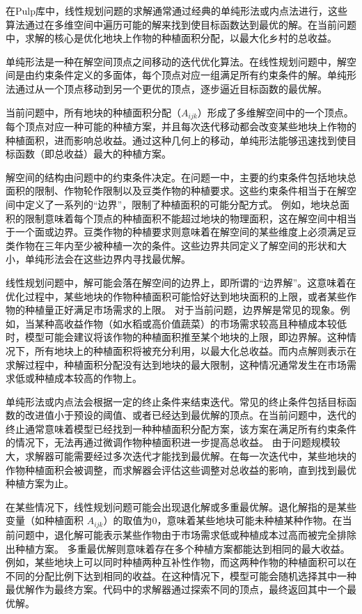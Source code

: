 \documentclass[12pt,a4paper]{nmmcm}
\begin{document}
在Pulp库中，线性规划问题的求解通常通过经典的单纯形法或内点法进行，这些算法通过在多维空间中遍历可能的解来找到使目标函数达到最优的解。在当前问题中，求解的核心是优化地块上作物的种植面积分配，以最大化乡村的总收益。

单纯形法是一种在解空间顶点之间移动的迭代优化算法。在线性规划问题中，解空间是由约束条件定义的多面体，每个顶点对应一组满足所有约束条件的解。单纯形法通过从一个顶点移动到另一个更优的顶点，逐步逼近目标函数的最优解。

当前问题中，所有地块的种植面积分配（$A_{ijk}$）形成了多维解空间中的一个顶点。每个顶点对应一种可能的种植方案，并且每次迭代移动都会改变某些地块上作物的种植面积，进而影响总收益。通过这种几何上的移动，单纯形法能够迅速找到使目标函数（即总收益）最大的种植方案。

解空间的结构由问题中的约束条件决定。在问题一中，主要的约束条件包括地块总面积的限制、作物轮作限制以及豆类作物的种植要求。这些约束条件相当于在解空间中定义了一系列的“边界”，限制了种植面积的可能分配方式。 例如，地块总面积的限制意味着每个顶点的种植面积不能超过地块的物理面积，这在解空间中相当于一个面或边界。豆类作物的种植要求则意味着在解空间的某些维度上必须满足豆类作物在三年内至少被种植一次的条件。这些边界共同定义了解空间的形状和大小，单纯形法会在这些边界内寻找最优解。
  
线性规划问题中，解可能会落在解空间的边界上，即所谓的“边界解”。这意味着在优化过程中，某些地块的作物种植面积可能恰好达到地块面积的上限，或者某些作物的种植量正好满足市场需求的上限。 对于当前问题，边界解是常见的现象。例如，当某种高收益作物（如水稻或高价值蔬菜）的市场需求较高且种植成本较低时，模型可能会建议将该作物的种植面积推至某个地块的上限，即边界解。这种情况下，所有地块上的种植面积将被充分利用，以最大化总收益。而内点解则表示在求解过程中，种植面积分配没有达到地块的最大限制，这种情况通常发生在市场需求低或种植成本较高的作物上。
  
单纯形法或内点法会根据一定的终止条件来结束迭代。常见的终止条件包括目标函数的改进值小于预设的阈值、或者已经达到最优解的顶点。在当前问题中，迭代的终止通常意味着模型已经找到一种种植面积分配方案，该方案在满足所有约束条件的情况下，无法再通过微调作物种植面积进一步提高总收益。 由于问题规模较大，求解器可能需要经过多次迭代才能找到最优解。在每一次迭代中，某些地块的作物种植面积会被调整，而求解器会评估这些调整对总收益的影响，直到找到最优种植方案为止。
  
在某些情况下，线性规划问题可能会出现退化解或多重最优解。退化解指的是某些变量（如种植面积 $A_{ijk}$）的取值为0，意味着某些地块可能未种植某种作物。在当前问题中，退化解可能表示某些作物由于市场需求低或种植成本过高而被完全排除出种植方案。 多重最优解则意味着存在多个种植方案都能达到相同的最大收益。例如，某些地块上可以同时种植两种互补性作物，而这两种作物的种植面积可以在不同的分配比例下达到相同的收益。在这种情况下，模型可能会随机选择其中一种最优解作为最终方案。代码中的求解器通过探索不同的顶点，最终返回其中一个最优解。
\end{document}
